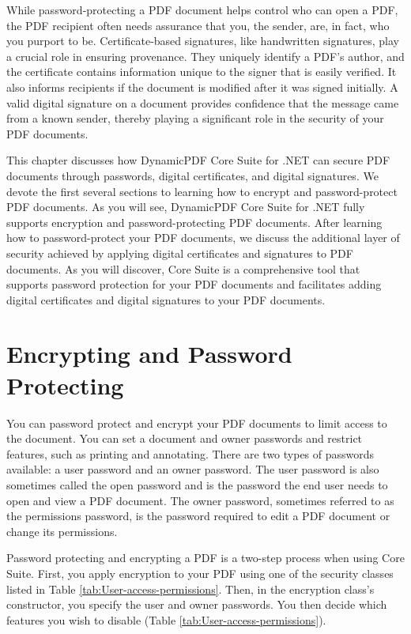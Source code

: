 \documentclass[american,letterpaper]{tufte-book}
\numberwithin{equation}{section}
\numberwithin{figure}{section}
\begin{document}
{While password-protecting a PDF document helps control who can open
a PDF, the PDF recipient often needs assurance that you, the sender,
are, in fact, who you purport to be. Certificate-based signatures,
like handwritten signatures, play a crucial role in ensuring provenance.
They uniquely identify a PDF's author, and the certificate contains
information unique to the signer that is easily verified. It also
informs recipients if the document is modified after it was signed
initially. A valid digital signature on a document provides confidence
that the message came from a known sender, thereby playing a significant
role in the security of your PDF documents.

This chapter discusses how DynamicPDF Core Suite for .NET can
secure PDF documents through passwords, digital certificates, and
digital signatures. We devote the first several sections to learning
how to encrypt and password-protect PDF documents. As you will see,
 DynamicPDF Core Suite for .NET fully supports encryption and password-protecting
PDF documents. After learning how to password-protect your PDF documents,
we discuss the additional layer of security achieved by applying digital
certificates and signatures to PDF documents. As you will discover,
Core Suite is a comprehensive tool that supports password protection
for your PDF documents and facilitates adding digital certificates
and digital signatures to your PDF documents. 

\section{Encrypting and Password Protecting}

You can password protect and encrypt your PDF documents to limit access
to the document. You can set a document and owner passwords and restrict
features, such as printing and annotating. There are two types of
passwords available: a user password and an owner password. The user
password is also sometimes called the open password and is the password
the end user needs to open and view a PDF document. The owner password,
sometimes referred to as the permissions password, is the password
required to edit a PDF document or change its permissions. 

Password protecting and encrypting a PDF is a two-step process when
using Core Suite. First, you apply encryption to your PDF using one
of the security classes listed in Table \ref{tab:User-access-permissions}.
Then, in the encryption class’s constructor, you specify the user
and owner passwords. You then decide which features you wish to disable
(Table \ref{tab:User-access-permissions}). 

}
\end{document}
